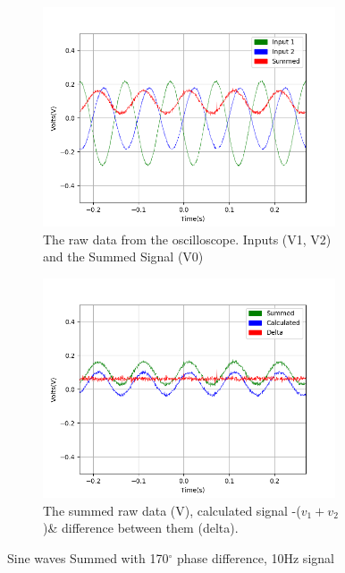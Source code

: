 \begin{figure}[h!]
\centering
\begin{subfigure}[t]{.475\textwidth}
  \centering
  \includegraphics[width=0.95\textwidth, height=0.24\textheight]{figures/Summing/scope_5raw.png}
  \caption{The raw data from the oscilloscope. Inputs (V1, V2) and the Summed Signal (V0)}
 \label{fig:sum_5_og_data}
\end{subfigure}\hfill
\begin{subfigure}[t]{.475\textwidth}
  \centering
  \includegraphics[width=0.95\textwidth, height=0.24\textheight]{figures/Summing/scope_5.png}
  \caption{The summed raw data (V), calculated signal -($v_1 + v_2$)\& difference between them (delta).}
\label{fig:sum_5_calc_data}
\end{subfigure}
\caption{Sine waves Summed with 170$^\circ$ phase difference, 10Hz signal}
\label{fig:sum_5}
\end{figure}

